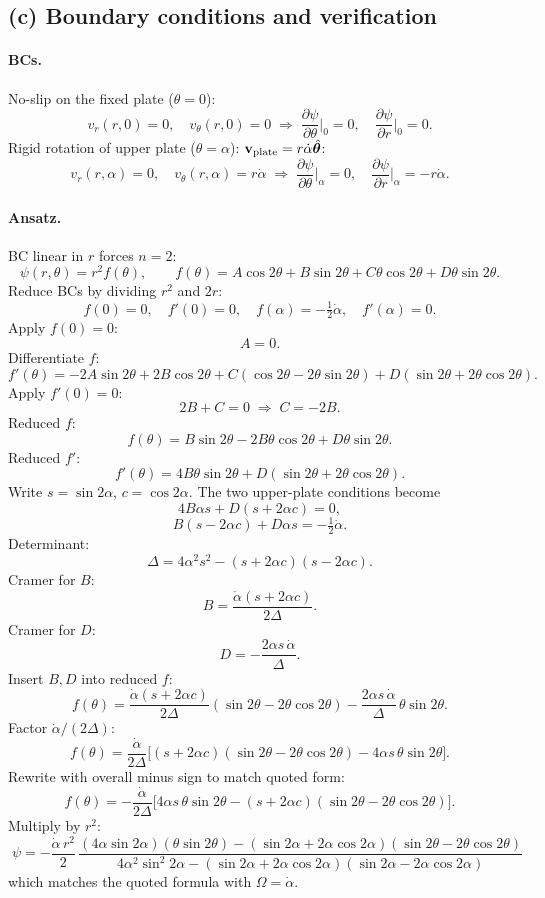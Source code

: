\documentclass[11pt]{article}
\newcommand{\pd}[2]{\frac{\partial #1}{\partial #2}}
\newcommand{\thhat}{\hat{\boldsymbol{\theta}}}
\begin{document}
\subsection*{(c) Boundary conditions and verification}

\paragraph{BCs.} No-slip on the fixed plate ($\theta=0$):
\[ v_r(r,0)=0,\quad v_\theta(r,0)=0\;\Longrightarrow\; \pd{\psi}{\theta}\bigg|_{0}=0,\quad \pd{\psi}{r}\bigg|_{0}=0. \]
Rigid rotation of upper plate ($\theta=\alpha$): $\vb v_{\rm plate}=r\dot\alpha\thhat$:
\[ v_r(r,\alpha)=0,\quad v_\theta(r,\alpha)=r\dot\alpha\;\Longrightarrow\; \pd{\psi}{\theta}\bigg|_{\alpha}=0,\quad \pd{\psi}{r}\bigg|_{\alpha}=-r\dot\alpha. \]

\paragraph{Ansatz.} BC linear in $r$ forces $n=2$:
\[ \psi(r,\theta) = r^{2}f(\theta),\qquad f(\theta) = A\cos 2\theta+B\sin 2\theta+C\theta\cos 2\theta+D\theta\sin 2\theta. \]
Reduce BCs by dividing $r^{2}$ and $2r$:
\[ f(0)=0,\quad f'(0)=0,\quad f(\alpha)=-\tfrac12\dot\alpha,\quad f'(\alpha)=0. \]
Apply $f(0)=0$:
\[ A=0. \]
Differentiate $f$:
\[ f'(\theta)=-2A\sin 2\theta+2B\cos 2\theta+C(\cos 2\theta-2\theta\sin 2\theta)+D(\sin 2\theta+2\theta\cos 2\theta). \]
Apply $f'(0)=0$:
\[ 2B+C=0\;\Longrightarrow\; C=-2B. \]
Reduced $f$:
\[ f(\theta)=B\sin 2\theta-2B\theta\cos 2\theta+D\theta\sin 2\theta. \]
Reduced $f'$:
\[ f'(\theta) = 4B\theta\sin 2\theta + D(\sin 2\theta+2\theta\cos 2\theta). \]
Write $s=\sin 2\alpha$, $c=\cos 2\alpha$. The two upper-plate conditions become
\[ 4B\alpha s + D(s+2\alpha c) = 0, \]
\[ B(s-2\alpha c) + D\alpha s = -\tfrac12\dot\alpha. \]
Determinant:
\[ \Delta = 4\alpha^{2}s^{2} - (s+2\alpha c)(s-2\alpha c). \]
Cramer for $B$:
\[ B = \frac{\dot\alpha(s+2\alpha c)}{2\Delta}. \]
Cramer for $D$:
\[ D = -\frac{2\alpha s\,\dot\alpha}{\Delta}. \]
Insert $B,D$ into reduced $f$:
\[ f(\theta) = \frac{\dot\alpha(s+2\alpha c)}{2\Delta}(\sin 2\theta - 2\theta\cos 2\theta) - \frac{2\alpha s\,\dot\alpha}{\Delta}\,\theta\sin 2\theta. \]
Factor $\dot\alpha/(2\Delta)$:
\[ f(\theta) = \frac{\dot\alpha}{2\Delta}\bigl[(s+2\alpha c)(\sin 2\theta - 2\theta\cos 2\theta) - 4\alpha s\,\theta\sin 2\theta\bigr]. \]
Rewrite with overall minus sign to match quoted form:
\[ f(\theta) = -\frac{\dot\alpha}{2\Delta}\bigl[4\alpha s\,\theta\sin 2\theta - (s+2\alpha c)(\sin 2\theta - 2\theta\cos 2\theta)\bigr]. \]
Multiply by $r^{2}$:
\begin{equation}
\boxed{\;\psi = -\frac{\dot\alpha\,r^{2}}{2}\,\frac{(4\alpha\sin 2\alpha)(\theta\sin 2\theta)-(\sin 2\alpha+2\alpha\cos 2\alpha)(\sin 2\theta-2\theta\cos 2\theta)}{4\alpha^{2}\sin^{2}2\alpha-(\sin 2\alpha+2\alpha\cos 2\alpha)(\sin 2\alpha-2\alpha\cos 2\alpha)}\;}
\label{eq:psi-quoted}
\end{equation}
which matches the quoted formula with $\Omega=\dot\alpha$.
\end{document}
